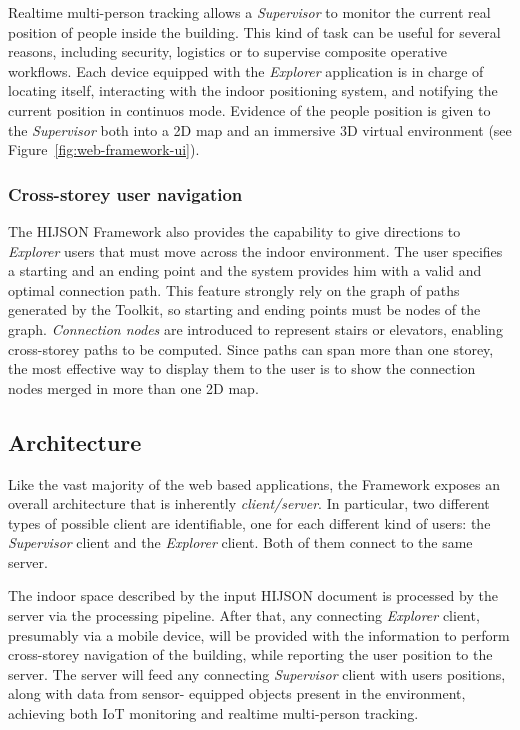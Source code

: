 Realtime multi-person tracking allows a \emph{Supervisor} to monitor the current
real position of people inside the building. This kind of task can be useful for
several reasons, including security, logistics or to supervise composite operative
workflows. Each device equipped with the \emph{Explorer} application is in charge of locating
itself, interacting with the indoor positioning system, and notifying the current
position in continuos mode. Evidence of the people position is given to the
\emph{Supervisor} both into a 2D map and an immersive 3D virtual environment (see Figure~\ref{fig:web-framework-ui}).

\subsubsection{Cross-storey user navigation}\label{cross-storey-user-navigation}

The HIJSON Framework also provides the capability to give directions to
\emph{Explorer} users that must move across the indoor environment. The
user specifies a starting and an ending point and the system provides him with
a valid and optimal connection path. This feature
strongly rely on the graph of paths generated by the Toolkit, so starting and
ending points must be nodes of the graph. \emph{Connection nodes} are introduced to
represent stairs or elevators, enabling cross-storey paths to be computed.
Since paths can span more than one storey, the most effective way
to display them to the user is to show the connection nodes merged in more than one 2D map.

\subsection{Architecture}\label{architecture}

Like the vast majority of the web based applications, the Framework exposes an
overall architecture that is inherently \emph{client/server}. In particular,
two different types of possible client are identifiable, one for each different 
kind of users: the \emph{Supervisor} client and the \emph{Explorer} client. 
Both of them connect to the same server.

The indoor space described by the input HIJSON document is
processed by the server via the processing pipeline. After that, any connecting
\emph{Explorer} client, presumably via a mobile device, will be provided
with the information to perform cross-storey navigation of the building, while
reporting the user position to the server. The server will feed any connecting
\emph{Supervisor} client with users positions, along with data from sensor-
equipped objects present in the environment, achieving both IoT monitoring and 
realtime multi-person tracking.

